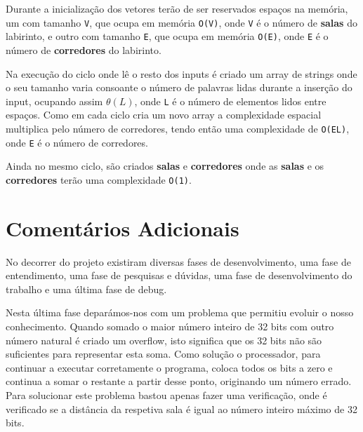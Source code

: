 \documentclass[11pt]{article}
\begin{document}
Durante a inicialização dos vetores terão de ser reservados espaços na memória,
um com tamanho \verb|V|, que ocupa em memória \verb|O(V)|, onde \verb|V| é o número de
\textbf{salas} do labirinto, e outro com tamanho \verb|E|, que ocupa em memória \verb|O(E)|,
onde \verb|E| é o número de \textbf{corredores} do labirinto.

Na execução do ciclo onde lê o resto dos inputs é criado um array de strings onde o seu tamanho
varia consoante o número de palavras lidas durante a inserção do input, ocupando assim $\theta(L)$,
onde \verb|L| é o número de elementos lidos entre espaços. Como em cada ciclo cria um novo array
a complexidade espacial multiplica pelo número de corredores, tendo então uma complexidade de
\verb|O(EL)|, onde \verb|E| é o número de corredores.

Ainda no mesmo ciclo, são criados \textbf{salas} e \textbf{corredores} onde as \textbf{salas} e os
\textbf{corredores} terão uma complexidade \verb|O(1)|. 
\section{Comentários Adicionais}

\hspace{0,5cm}No decorrer do projeto existiram diversas fases de desenvolvimento, uma fase 
de entendimento, uma fase de pesquisas e dúvidas, uma fase de desenvolvimento do trabalho e
uma última fase de debug.

Nesta última fase deparámos-nos com um problema que permitiu evoluir
o nosso conhecimento. Quando somado o maior número inteiro de 32 bits com outro número natural
é criado um overflow, isto significa que os 32 bits não são suficientes para representar esta
soma. Como solução o processador, para continuar a executar corretamente o programa, coloca
todos os bits a zero e continua a somar o restante a partir desse ponto, originando um número
errado. Para solucionar este problema bastou apenas fazer uma verificação, onde é
verificado se a distância da respetiva sala é igual ao número inteiro máximo de 32 bits. 
\end{document}
